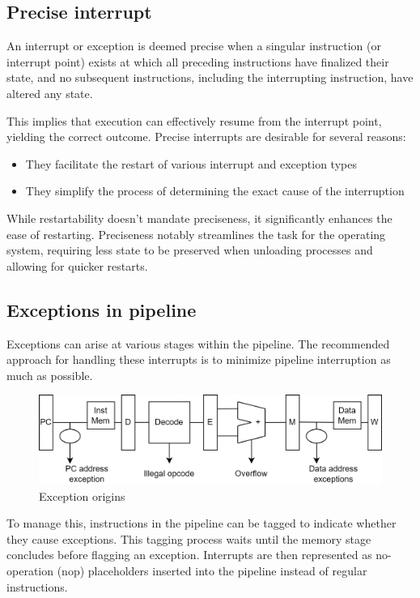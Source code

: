 \subsection{Precise interrupt}
\begin{definition}
    An interrupt or exception is deemed precise when a singular instruction (or interrupt point) exists at which all preceding instructions have finalized their state, and no subsequent instructions, including the interrupting instruction, have altered any state.
\end{definition}
This implies that execution can effectively resume from the interrupt point, yielding the correct outcome.
Precise interrupts are desirable for several reasons:
\begin{itemize}
    \item They facilitate the restart of various interrupt and exception types
    \item They simplify the process of determining the exact cause of the interruption
\end{itemize}
While restartability doesn't mandate preciseness, it significantly enhances the ease of restarting. 
Preciseness notably streamlines the task for the operating system, requiring less state to be preserved when unloading processes and allowing for quicker restarts.

\subsection{Exceptions in pipeline}
Exceptions can arise at various stages within the pipeline. 
The recommended approach for handling these interrupts is to minimize pipeline interruption as much as possible.
\begin{figure}[H]
    \centering
    \includegraphics[width=0.75\linewidth]{images/5s.png}
    \caption{Exception origins}
\end{figure}
To manage this, instructions in the pipeline can be tagged to indicate whether they cause exceptions. 
This tagging process waits until the memory stage concludes before flagging an exception. 
Interrupts are then represented as no-operation (nop) placeholders inserted into the pipeline instead of regular instructions.

